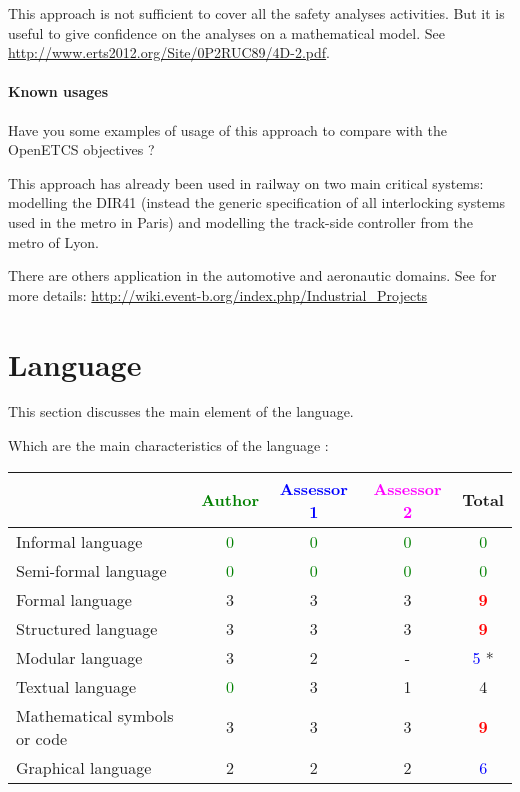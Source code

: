 \begin{author_comment}
This approach is not sufficient to cover all the safety analyses activities. But it is useful to give confidence on the analyses on a mathematical model. See \url{http://www.erts2012.org/Site/0P2RUC89/4D-2.pdf}.
\end{author_comment}


\paragraph{Known usages} Have you some examples of usage of this approach to  compare with the OpenETCS objectives ?


\begin{author_comment}
This approach has already been used in railway on two  main critical systems: modelling the DIR41 (instead the generic specification of all interlocking systems used in the metro in Paris)  and modelling the track-side controller from the metro of Lyon. 

There are others application in the automotive and aeronautic domains. See for more details: \url{http://wiki.event-b.org/index.php/Industrial_Projects}
\end{author_comment}


\section{Language}
This section discusses the main element of the language.

Which are the main characteristics of the language :

\begin{tabular}{|l | c | c | c | c|}
\hline
& \textcolor{green}{Author} & \textcolor{blue}{Assessor 1} & \textcolor{magenta}{Assessor 2} & Total \\
\hline 
Informal language & \textcolor{green}{0} & \textcolor{green}{0} & \textcolor{green}{0} & \textcolor{green}{0}  \\
\hline 
Semi-formal language & \textcolor{green}{0} & \textcolor{green}{0} & \textcolor{green}{0} & \textcolor{green}{0} \\
\hline
Formal language & 3     & 3     & 3     & \textcolor{red}{\textbf{9}} \\
\hline
Structured language & 3     & 3     & 3     & \textcolor{red}{\textbf{9}} \\
\hline
Modular language & 3     & 2     & - & \textcolor{blue}{5} * \\
\hline
Textual language & \textcolor{green}{0} & 3     & 1     & 4     \\
\hline
Mathematical symbols or code & 3     & 3     & 3     & \textcolor{red}{\textbf{9}} \\
\hline
Graphical language & 2     & 2     & 2     & \textcolor{blue}{6} \\
\hline
\end{tabular}

